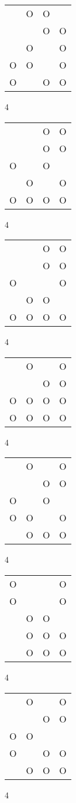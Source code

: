 \begin{tabular}{|m{0.2cm}m{0.2cm}m{0.2cm}m{0.2cm}|}\hline
 &O&O& \\
 & &O&O\\
 &O& &O\\
O&O& &O\\
O& &O&O\\
\hline\end{tabular}4
\begin{tabular}{|m{0.2cm}m{0.2cm}m{0.2cm}m{0.2cm}|}\hline
 & &O&O\\
 & &O&O\\
O& &O& \\
 &O& &O\\
O&O&O&O\\
\hline\end{tabular}4
\begin{tabular}{|m{0.2cm}m{0.2cm}m{0.2cm}m{0.2cm}|}\hline
 & &O&O\\
 & &O&O\\
O& & &O\\
 &O&O& \\
O&O&O&O\\
\hline\end{tabular}4
\begin{tabular}{|m{0.2cm}m{0.2cm}m{0.2cm}m{0.2cm}|}\hline
 &O& &O\\
 & &O&O\\
O&O&O&O\\
O&O&O&O\\
\hline\end{tabular}4
\begin{tabular}{|m{0.2cm}m{0.2cm}m{0.2cm}m{0.2cm}|}\hline
 &O& &O\\
 & &O&O\\
O& &O& \\
O&O& &O\\
 &O&O&O\\
\hline\end{tabular}4
\begin{tabular}{|m{0.2cm}m{0.2cm}m{0.2cm}m{0.2cm}|}\hline
O& & &O\\
O& & &O\\
 &O&O& \\
 &O&O&O\\
 &O&O&O\\
\hline\end{tabular}4
\begin{tabular}{|m{0.2cm}m{0.2cm}m{0.2cm}m{0.2cm}|}\hline
 &O& &O\\
 & &O&O\\
O&O& & \\
O& &O&O\\
 &O&O&O\\
\hline\end{tabular}4
